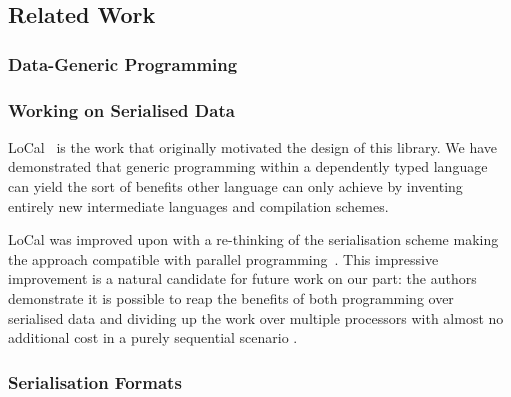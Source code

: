 
\subsection{Related Work}

\subsubsection{Data-Generic Programming}


\cite{DBLP:phd/ethos/Morris07}
\cite{DBLP:conf/icfp/LohM11}

\subsubsection{Working on Serialised Data}

LoCal~\cite{DBLP:conf/pldi/VollmerKRS0N19} is the work that originally
motivated the design of this library.
%
We have demonstrated that generic programming within a dependently typed
language can yield the sort of benefits other language can only achieve
by inventing entirely new intermediate languages and compilation schemes.

LoCal was improved upon with a re-thinking of the serialisation scheme
making the approach compatible with parallel
programming~\cite{DBLP:journals/pacmpl/KoparkarRVKN21}.
This impressive improvement is a natural candidate for future work on our
part: the authors demonstrate it is possible to reap the benefits of
both programming over serialised data
and dividing up the work over multiple processors
with almost no additional cost in a purely sequential scenario .

\subsubsection{Serialisation Formats}


